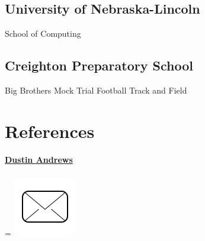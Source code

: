 \documentclass[]{latex/resume}
\begin{document}
\begin{minipage}[t]{0.25\textwidth}
    \subsection{University of Nebraska-Lincoln}
    School of Computing \\

    \sectionsep

    \subsection{Creighton Preparatory School} 
    Big Brothers \textbullet{} Mock Trial \textbullet{} Football \textbullet{} Track and Field 
    \\   

    \sectionsep


\section{References}

    \href{https://www.linkedin.com/in/dustin-andrews-4056b232/}{\textbf{Dustin Andrews}} 
     \\ 
     \\  
    \begingroup
        =\hbox{
            \includegraphics[scale=0.1,trim={0 1cm 0cm 0cm}]{latex/icons/mail.png}\hspace{0.1cm} 
        }}
        \parbox{\wd0}{}
    \endgroup
    


\end{minipage}
\end{document}
